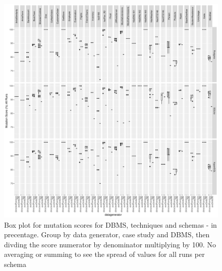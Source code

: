\documentclass[runningheads,a4paper]{llncs}
\begin{document}
\begin{figure}[htbp]
\centering
\includegraphics{../plots/figure8.pdf}
\caption{Box plot for mutation scores for DBMS, techniques and schemas -
in precentage. Group by data generator, case study and DBMS, then
divding the score numerator by denominator multiplying by 100. No
averaging or summing to see the spread of values for all runs per
schema}
\end{figure}
\end{document}
